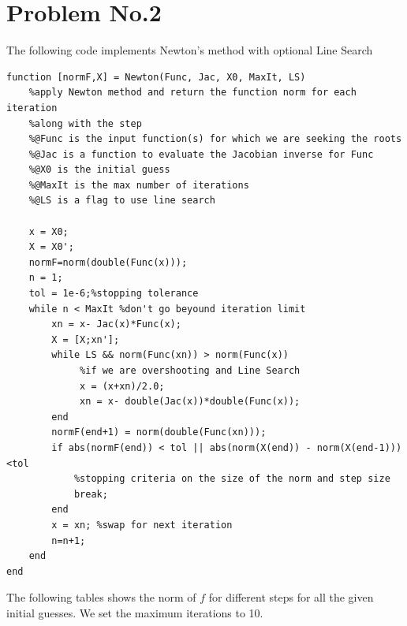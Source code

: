 \section*{Problem No.2} \label{sec:prob2}
The following code implements Newton's method with optional Line Search 

\begin{lstlisting}
function [normF,X] = Newton(Func, Jac, X0, MaxIt, LS)   
    %apply Newton method and return the function norm for each iteration 
    %along with the step 
    %@Func is the input function(s) for which we are seeking the roots    
    %@Jac is a function to evaluate the Jacobian inverse for Func    
    %@X0 is the initial guess     
    %@MaxIt is the max number of iterations     
    %@LS is a flag to use line search     
    
    x = X0;
    X = X0';
    normF=norm(double(Func(x)));
    n = 1;
    tol = 1e-6;%stopping tolerance 
    while n < MaxIt %don't go beyound iteration limit 
        xn = x- Jac(x)*Func(x);
        X = [X;xn'];
        while LS && norm(Func(xn)) > norm(Func(x))
             %if we are overshooting and Line Search 
             x = (x+xn)/2.0;
             xn = x- double(Jac(x))*double(Func(x));
        end
        normF(end+1) = norm(double(Func(xn)));               
        if abs(normF(end)) < tol || abs(norm(X(end)) - norm(X(end-1))) <tol
            %stopping criteria on the size of the norm and step size 
            break;
        end
        x = xn; %swap for next iteration  
        n=n+1;
    end
end
\end{lstlisting}

The following tables shows the norm of $f$ for different steps for all the given initial guesses. We set the maximum iterations to 10. 

